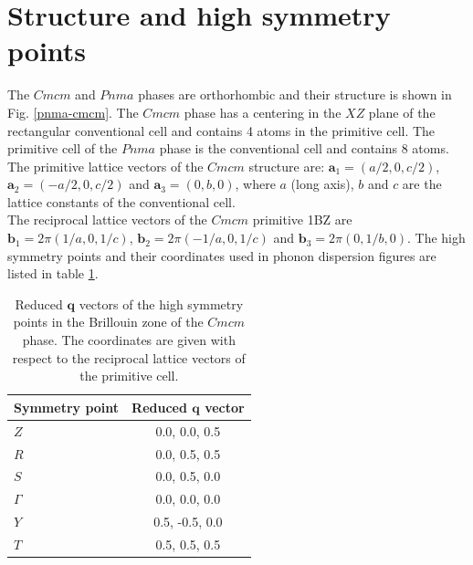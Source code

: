 \section{Structure and high symmetry points}

The $Cmcm$ and $Pnma$ phases are orthorhombic and their structure  is shown in Fig. \ref{pnma-cmcm}. The $Cmcm$ phase 
has a centering in the $XZ$ plane of the rectangular conventional cell and contains 4 atoms in the primitive cell. 
The primitive cell of the $Pnma$ phase is the conventional cell and contains $8$ atoms. The primitive lattice vectors 
of the $Cmcm$ structure are: $\mathbf{a}_{1}=(a/2,0,c/2)$, $\mathbf{a}_{2}=(-a/2,0,c/2)$ and
$\mathbf{a}_{3}=(0,b,0)$, where $a$ (long axis), $b$ and $c$ are the lattice constants of the conventional cell. \\

The reciprocal lattice vectors of the $Cmcm$ primitive 1BZ are $\mathbf{b}_{1}=2\pi(1/a,0,1/c)$, 
$\mathbf{b}_{2}=2\pi(-1/a,0,1/c)$ and $\mathbf{b}_{3}=2\pi(0,1/b,0)$. The high symmetry points and their coordinates 
used in phonon dispersion figures are listed in table \ref{qpoints}.
\begin{table}
\begin{center}
\begin{tabular*}{0.45\textwidth}{l c}
 \hline
 \hline
             Symmetry point  & Reduced $\mathbf{q}$ vector  \\
 \hline
 $Z$                  &  0.0, 0.0, 0.5  \\
 $R$                  &  0.0, 0.5, 0.5  \\
 $S$                  &  0.0, 0.5, 0.0  \\
 $\Gamma$             &  0.0, 0.0, 0.0  \\
 $Y$                  &  0.5, -0.5, 0.0  \\
 $T$                  &  0.5, 0.5, 0.5  \\
 \hline
 \hline
\end{tabular*}
\end{center}
\caption[Reduced $\mathbf{q}$ vectors of the high symmetry points in the Brillouin zone of the $Cmcm$ phase.]{Reduced 
$\mathbf{q}$ vectors of the high symmetry points in the Brillouin zone of the $Cmcm$ phase. The coordinates are given 
with respect to the reciprocal lattice vectors of the primitive cell.}
\label{qpoints}
\end{table}

